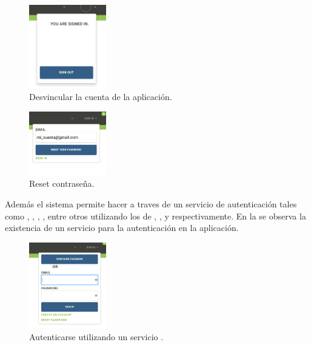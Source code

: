\begin{figure}[H]
	\centering
	\includegraphics[width=0.3\textwidth]{figuras/accounts/log_out.png}

	\caption{Desvincular la cuenta de la aplicación.}
	\label{figure:account:log_out}
\end{figure}

\begin{figure}[H]
	\centering
	\includegraphics[width=0.3\textwidth]{figuras/accounts/reset_password.png}

	\caption{Reset contraseña.}
	\label{figure:account:reset_password}
\end{figure}

Además el sistema permite hacer \loginCPT a traves de un servicio de autenticación \thirdParty tales como \facebook, \googleNAME, \twitterNAME, \gitHubNAME, entre otros utilizando los \packagesAS de \meteorNAME \accountFacebook, \accountGoogle, \accountTwitter y \accountGithub respectivamente. En la  se observa la existencia de un servicio \thirdParty para la autenticación en la aplicación.


\begin{figure}[H]
	\centering
	\includegraphics[width=0.3\textwidth]{figuras/accounts/log_in_plus_facebook.png}

	\caption{Autenticarse utilizando un servicio \thirdParty.}
	\label{figure:account:log_in_plus_facebook}
\end{figure}

